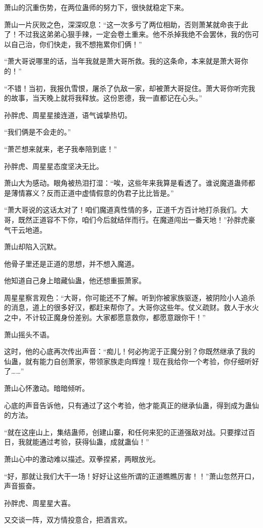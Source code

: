 \begin{this_body}
萧山的沉重伤势，在两位蛊师的努力下，很快就稳定下来。

萧山一片灰败之色，深深叹息：“这一次多亏了两位相助，否则萧某就命丧于此了！不过我这弟弟心狠手辣，一定会卷土重来。他不杀掉我绝不会罢休，我的伤可以自己治，你们快走，我不想拖累你们俩！”

“萧大哥说哪里的话，当年我就是萧大哥所救。我的这条命，本来就是萧大哥你的！”

“不错！当初，我报仇雪恨，屠杀了仇敌一家，却被萧大哥捉住。萧大哥你听完我的故事，当天晚上就将我释放。这份恩德，我一直都记在心头。”

孙胖虎、周星星接连道，语气诚挚热切。

“我们俩是不会走的。”

“萧芒想来就来，老子我奉陪到底！”

孙胖虎、周星星态度坚决无比。

萧山大为感动。眼角被热泪打湿：“唉，这些年来我算是看透了。谁说魔道蛊师都是薄情寡义？反而正道中虚情假意的伪君子比比皆是。”

“萧大哥说的这话太对了！咱们魔道真性情的多，正道千方百计地打杀我们。大哥，既然正道容不下你，咱们今后就结伴而行。在魔道闯出一番天地！”孙胖虎豪气干云地道。

萧山却陷入沉默。

他骨子里还是正道的思想，并不想入魔道。

他知道自己身上暗藏仙蛊，他还想重振萧家。

周星星察言观色：“大哥，你可能还不了解。听到你被家族驱逐，被阴险小人追杀的消息，道上的很多好汉，都赶来帮你了。大哥你这些年。仗义疏财。救人于水火之中，不计较正魔身份差别。大家都愿意救你，都愿意跟你干！”

萧山摇头不语。

这时，他的心底再次传出声音：“痴儿！何必拘泥于正魔分别？你既然继承了我的仙蛊，就有能力自创萧家，带领家族走向辉煌！现在我给你一个考验，你仔细听好了……”

萧山心怀激动。暗暗倾听。

心底的声音告诉他，只有通过了这个考验，他才能真正的继承仙蛊，得到成为蛊仙的方法。

“就在这座山上，集结蛊师，创建山寨，和任何来犯的正道强敌对战。只要撑过百日，我就能通过考验，获得仙蛊，成就蛊仙！”

萧山心中的激动难以描述。双拳捏紧，两眼放光。

“好，那就让我们大干一场！好好让这些所谓的正道瞧瞧厉害！！”萧山忽然开口，声音振奋。

孙胖虎、周星星大喜。

又交谈一阵，双方情投意合，把酒言欢。


\end{this_body}
